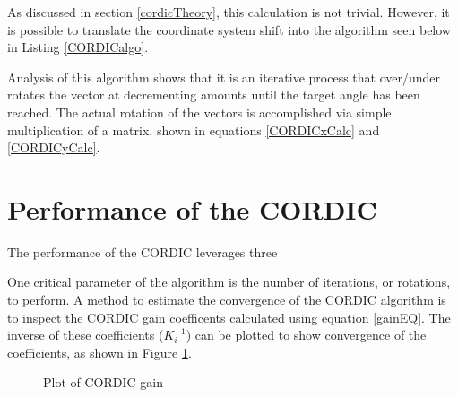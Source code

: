 \documentclass[11pt]{report}
\begin{document}
As discussed in section \ref{cordicTheory}, this calculation is not trivial. However, it is possible to translate the coordinate system shift into the algorithm seen below in Listing \ref{CORDICalgo}.

		\begin{singlespace}
            
        \end{singlespace}

Analysis of this algorithm shows that it is an iterative process that over/under rotates the vector at decrementing amounts until the target angle has been reached. The actual rotation of the vectors is accomplished via simple multiplication of a matrix, shown in equations \ref{CORDICxCalc} and \ref{CORDICyCalc}. 



\section{Performance of the CORDIC}

The performance of the CORDIC leverages three 



One critical parameter of the algorithm is the number of iterations, or rotations, to perform. A method to estimate the convergence of the CORDIC algorithm is to inspect the CORDIC gain coefficents calculated using equation \ref{gainEQ}. The inverse of these coefficients ($K_i ^{-1}$) can be plotted to show convergence of the coefficients, as shown in Figure \ref{CORDICcoeffPlot}.

\begin{figure}[h!]
\begin{center}

   \label{CORDICcoeffPlot}
   \caption{Plot of CORDIC gain}
   
\end{center}

\end{figure}
\FloatBarrier
\end{document}
